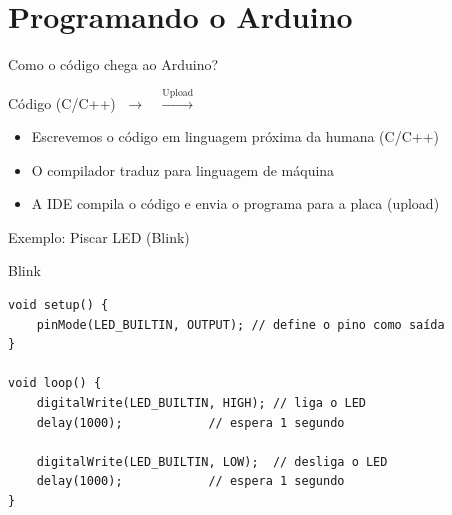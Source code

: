 \section{Programando o Arduino}

\begin{frame}{Como o código chega ao Arduino?}
  \begin{center}
    \Large
    Código (C/C++)
    $\;\rightarrow\;$
    $\;\xrightarrow{\text{Upload}}\;$
  \end{center}
  \vspace{0.6cm}
  \begin{itemize}
    \item Escrevemos o código em linguagem próxima da humana (C/C++)
    \item O compilador traduz para linguagem de máquina
    \item A IDE compila o código e envia o programa para a placa (upload)
  \end{itemize}
\end{frame}

\begin{frame}[fragile]{Exemplo: Piscar LED (Blink)}
  \begin{block}{Blink}
    \begin{verbatim}
void setup() {
    pinMode(LED_BUILTIN, OUTPUT); // define o pino como saída
}

void loop() {
    digitalWrite(LED_BUILTIN, HIGH); // liga o LED
    delay(1000);            // espera 1 segundo

    digitalWrite(LED_BUILTIN, LOW);  // desliga o LED
    delay(1000);            // espera 1 segundo
}
    \end{verbatim}
  \end{block}
\end{frame}

